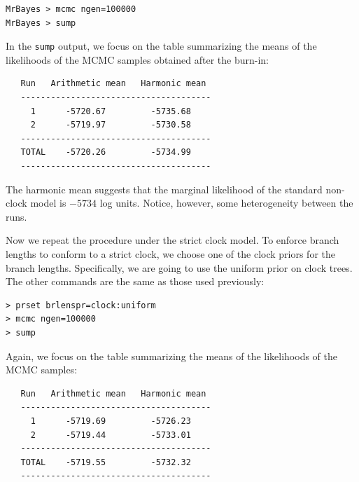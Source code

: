 \documentclass[12pt]{book}
\newcommand{\ttt}[1]{\texttt{#1}}
\begin{document}
\begin{singlespacing}
\begin{verbatim}
MrBayes > mcmc ngen=100000
MrBayes > sump
\end{verbatim}
\end{singlespacing}

In the \ttt{sump} output, we focus on the table summarizing the means of the likelihoods of the
MCMC samples obtained after the burn-in:

\begin{singlespacing}
\begin{verbatim}
   Run   Arithmetic mean   Harmonic mean
   --------------------------------------
     1      -5720.67         -5735.68
     2      -5719.97         -5730.58
   --------------------------------------
   TOTAL    -5720.26         -5734.99
   --------------------------------------
\end{verbatim}
\end{singlespacing}

The harmonic mean suggests that the marginal likelihood of the standard non-clock model is $-5734$
log units. Notice, however, some heterogeneity between the runs.

Now we repeat the procedure under the strict clock model. To enforce branch lengths to conform to a
strict clock, we choose one of the clock priors for the branch lengths. Specifically, we are going
to use the uniform prior on clock trees. The other commands are the same as those used previously:

\begin{singlespacing}
\begin{verbatim}
> prset brlenspr=clock:uniform
> mcmc ngen=100000
> sump
\end{verbatim}
\end{singlespacing}

Again, we focus on the table summarizing the means of the likelihoods of the MCMC samples:

\begin{singlespacing}
\begin{verbatim}
   Run   Arithmetic mean   Harmonic mean
   --------------------------------------
     1      -5719.69         -5726.23
     2      -5719.44         -5733.01
   --------------------------------------
   TOTAL    -5719.55         -5732.32
   --------------------------------------
\end{verbatim}
\end{singlespacing}
\end{document}

